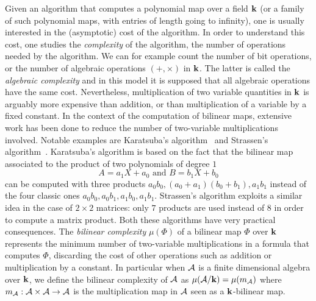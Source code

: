 \documentclass[11pt]{article}
\begin{document}
Given an algorithm that computes a polynomial map over a field $\mathbf{k}$
(or a family of such polynomial maps, with entries of length going to infinity),
one is
usually interested in the (asymptotic) cost of the algorithm. In order to
understand this cost, one studies the \emph{complexity} of the algorithm, \ie
the number of operations needed by the algorithm. We can for example count the number
of bit operations, or the number of algebraic operations $(+, \times)$ in $\mathbf{k}$. The latter is called the \emph{algebraic complexity}
and in this model it is supposed that all algebraic operations have the same cost.
Nevertheless, multiplication of two variable quantities in $\mathbf{k}$ is arguably more expensive than
addition, or than multiplication of a variable by a fixed constant. In the context of the computation of
bilinear maps, extensive work has been done to reduce the number of
two-variable multiplications involved. Notable examples are Karatsuba's
algorithm~\cite{Karatsuba63} and
Strassen's algorithm~\cite{Strassen69}. Karatsuba's algorithm is
based on the fact that the bilinear map associated to the product of two
polynomials of degree $1$
\[
  A = a_1 X + a_0\text{ and }B = b_1 X + b_0
\]
can be computed with three products $a_0b_0, (a_0+a_1)(b_0+b_1), a_1b_1$ instead
of the four classic ones $a_0b_0, a_0b_1, a_1b_0, a_1b_1$. Strassen's algorithm
exploits a similar idea in the case of $2\times2$ matrices: only $7$ products
are used instead of $8$ in order to compute a matrix product. Both these
algorithms have very practical consequences. The \emph{bilinear complexity}
$\mu(\Phi)$ of a bilinear map $\Phi$ over $\mathbf{k}$ represents the minimum number of two-variable
multiplications in a formula that computes $\Phi$, discarding the cost of other
operations such as addition or multiplication by a constant.
In particular when $\mathcal{A}$ is a finite dimensional algebra over $\mathbf{k}$,
we define the bilinear complexity of $\mathcal{A}$ as $\mu(\mathcal{A}/\mathbf{k})=\mu(m_{\mathcal{A}})$
where $m_{\mathcal{A}}:\mathcal{A}\times\mathcal{A}\to\mathcal{A}$ is the multiplication map in $\mathcal{A}$ seen
as a $\mathbf{k}$-bilinear map. 
\end{document}
